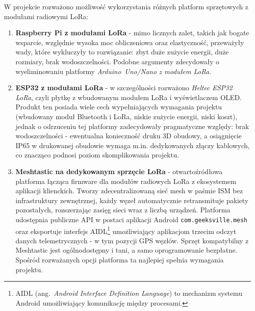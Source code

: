 W projekcie rozważono możliwość wykorzystania różnych platform sprzętowych z modułami radiowymi LoRa:
\begin{enumerate}
    \item \textbf{Raspberry Pi z modułami LoRa} - mimo licznych zalet, takich jak bogate wsparcie,
          względnie wysoka moc obliczeniowa oraz elastyczność, przeważyły wady, które wykluczyły to
          rozwiązanie: zbyt duże zużycie energii, duże rozmiary, brak wodoszczelności. Podobne
          argumenty zdecydowały o wyeliminowaniu platformy \textit{Arduino~Uno/Nano z modułem LoRa}.
    \item \textbf{ESP32 z modułami LoRa} - w szczególności rozważono \textit{Heltec ESP32 LoRa},
          czyli płytkę z wbudowanym modułem LoRa i wyświetlaczem OLED. Produkt ten posiada wiele
          cech wypełniających wymagania projektu (wbudowany moduł Bluetooth i LoRa, niskie zużycie
          energii, niski koszt), jednak o odrzuceniu tej platformy zadecydowały pragmatyczne względy: 
          brak wodoszczelności - ewentualna konieczność druku 3D obudowy, a osiągnięcie IP65 w drukowanej 
          obudowie wymaga m.in. dedykowanych złączy kablowych, co znacząco podnosi poziom skomplikowania projektu.
    \item \textbf{Meshtastic na dedykowanym sprzęcie LoRa} - otwartoźródłowa platforma łącząca
          firmware dla modułów radiowych LoRa z ekosystemem aplikacji klienckich. Tworzy
          zdecentralizowaną sieć mesh w paśmie ISM bez infrastruktury zewnętrznej, każdy węzeł
          automatycznie retransmituje pakiety pozostałych, rozszerzając zasięg sieci wraz
          z liczbą urządzeń. Platforma udostępnia publiczne API w postaci aplikacji Android
          \texttt{com.geeksville.mesh}~\cite{meshtasticAndroidRepo,meshtasticFirmwareBuildDocs} oraz eksportuje
          interfejs AIDL\footnote{AIDL (ang.\ \textit{Android Interface Definition Language}) to mechanizm
          systemu Android umożliwiający komunikację między procesami.} umożliwiający aplikacjom
          trzecim odczyt danych telemetrycznych - w tym pozycji GPS węzłów.
          Sprzęt kompatybilny z Meshtastic jest ogólnodostępny i tani, a samo oprogramowanie
          bezpłatne. Spośród rozważanych opcji platforma ta najlepiej spełnia wymagania projektu.
\end{enumerate}

